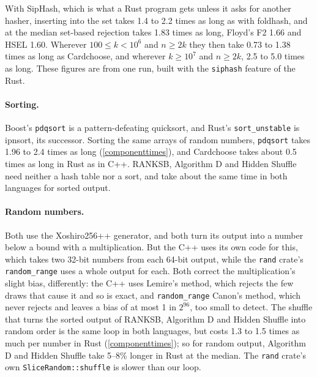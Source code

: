\documentclass[letterpaper,11pt]{article}
\begin{document}
With SipHash, which is what a Rust program gets unless it asks for
another hasher, inserting into the set takes 1.4 to 2.2 times as long
as with foldhash, and at the median set-based rejection takes 1.83
times as long, Floyd's F2 1.66 and HSEL 1.60. Wherever
\(100 \leq k < 10^6\) and \(n \geq 2k\) they then take 0.73 to 1.38
times as long as Cardchoose, and wherever \(k \geq 10^7\) and
\(n \geq 2k\), 2.5 to 5.0 times as long. These figures are from one
run, built with the \texttt{siphash} feature of the Rust.

\paragraph{Sorting.} Boost's \texttt{pdqsort} is a
pattern-defeating quicksort, and Rust's \texttt{sort_unstable}
is ipnsort, its successor. Sorting the same arrays of random numbers,
\texttt{pdqsort} takes 1.96 to 2.4 times as long
(\autoref{componenttimes}), and Cardchoose takes about 0.5 times as
long in Rust as in C++. RANKSB, Algorithm D and Hidden Shuffle need
neither a hash table nor a sort, and take about the same time in both
languages for sorted output.

\begin{table}
    \centering
    \small
    
    \caption{Time per number, in ns, to sort, shuffle and insert into a
    hash set \(k\) random numbers below \(2^{32} - 1\), measured as each
    operation's time less that of drawing the numbers
    alone}\label{componenttimes}
\end{table}

\paragraph{Random numbers.} Both use the Xoshiro256++ generator, and
both turn its output into a number below a bound with a
multiplication. But the C++ uses its own code for this, which takes two
32-bit numbers from each 64-bit output, while the
\texttt{rand} crate's \texttt{random_range} uses a
whole output for each. Both correct the multiplication's slight bias,
differently: the C++ uses Lemire's method, which rejects the few draws
that cause it and so is exact, and \texttt{random_range}
Canon's method, which never rejects and leaves a bias of at most 1 in
\(2^{96}\), too small to detect. The shuffle that turns the sorted output of
RANKSB, Algorithm D and Hidden Shuffle into random order is the same
loop in both languages, but costs 1.3 to 1.5 times as much per number
in Rust (\autoref{componenttimes}); so for random
output, Algorithm D and Hidden Shuffle take 5--8\% longer in Rust at
the median. The \texttt{rand} crate's own
\texttt{SliceRandom::shuffle} is slower than our loop.
\end{document}

